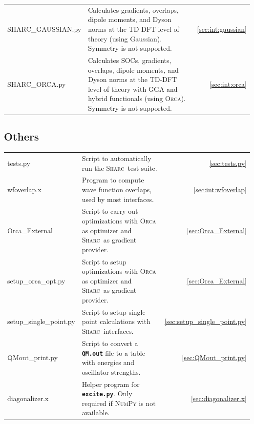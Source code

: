 \documentclass[a4paper,10pt,DIV=15,openany]{scrbook}
\newcommand{\sharc}{\textsc{Sharc}}
\newcommand{\ttt}[1]{\textbf{\texttt{#1}}}
\begin{document}
\begin{tabular}{>{\ttfamily}lp{10.5cm}r}
  SHARC\_GAUSSIAN.py    &Calculates       gradients,                         overlaps,     dipole moments, and Dyson norms at the TD-DFT level of theory (using Gaussian). Symmetry is not supported.  &\ref{sec:int:gaussian}\\
  SHARC\_ORCA.py        &Calculates SOCs, gradients,                         overlaps,     dipole moments, and Dyson norms at the TD-DFT level of theory with GGA and hybrid functionals (using \textsc{Orca}). Symmetry is not supported.  &\ref{sec:int:orca}\\
\end{tabular}


\subsection{Others}

\begin{tabular}{>{\ttfamily}lp{10.5cm}r}
  tests.py              &Script to automatically run the \sharc\ test suite.                                                    &\ref{sec:tests.py}\\
  wfoverlap.x           &Program to compute wave function overlaps, used by most interfaces.                                    &\ref{sec:int:wfoverlap}\\
  Orca\_External        &Script to carry out optimizations with \textsc{Orca} as optimizer and \sharc\ as gradient provider.    &\ref{sec:Orca_External}\\
  setup\_orca\_opt.py   &Script to setup optimizations with \textsc{Orca} as optimizer and \sharc\ as gradient provider.        &\ref{sec:Orca_External}\\
  setup\_single\_point.py   &Script to setup single point calculations with \sharc\ interfaces.        &\ref{sec:setup_single_point.py}\\
  QMout\_print.py       &Script to convert a \ttt{QM.out} file to a table with energies and oscillator strengths.               &\ref{sec:QMout_print.py}\\
  diagonalizer.x        &Helper program for \ttt{excite.py}. Only required if \textsc{NumPy} is not available.                  &\ref{sec:diagonalizer.x}\\
\end{tabular}

\end{document}
